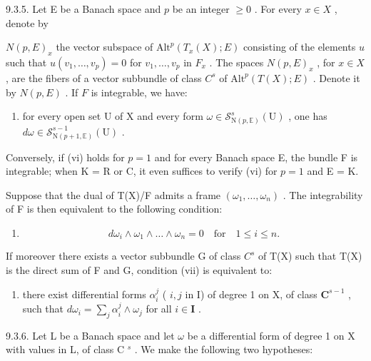 9.3.5. Let E be a Banach space and \(p\) be an integer \(\geqslant 0\) . For every \(x \in X\) , denote by

\(N(p, E)_{x}\) the vector subspace of \(\text{Alt}^{p}(T_{x}(X); E)\) consisting of the elements \(u\) such that \(u(v_{1}, \ldots, v_{p}) = 0\) for \(v_{1}, \ldots, v_{p}\) in \(F_{x}\) . The spaces \(N(p, E)_{x}\) , for \(x \in X\) , are the fibers of a vector subbundle of class \(C^{s}\) of \(\text{Alt}^{p}(T(X); E)\) . Denote it by \(N(p, E)\) . If \(F\) is integrable, we have:

\begin{enumerate}
\def\labelenumi{(\roman{enumi})}
\setcounter{enumi}{5}
\tightlist
\item
  for every open set U of X and every form \(\omega \in \mathcal{S}_{\mathrm{N}(p,\mathbb{E})}^s (\mathrm{U})\) , one has \(d\omega \in \mathcal{S}_{\mathrm{N}(p + 1,\mathbb{E})}^{s - 1}(\mathrm{U})\) .
\end{enumerate}

Conversely, if (vi) holds for \(p=1\) and for every Banach space E, the bundle F is integrable; when K = R or C, it even suffices to verify (vi) for \(p=1\) and E = K.

Suppose that the dual of T(X)/F admits a frame \((\omega_{1},\ldots,\omega_{n})\) . The integrability of F is then equivalent to the following condition:

\begin{enumerate}
\def\labelenumi{(\roman{enumi})}
\setcounter{enumi}{6}
\tightlist
\item
  \[
  d \omega_ {i} \wedge \omega_ {1} \wedge \dots \wedge \omega_ {n} = 0 \quad \text {for} \quad 1 \leqslant i \leqslant n.
  \]
\end{enumerate}

If moreover there exists a vector subbundle G of class \(C^{s}\) of T(X) such that T(X) is the direct sum of F and G, condition (vii) is equivalent to:

\begin{enumerate}
\def\labelenumi{(\roman{enumi})}
\setcounter{enumi}{7}
\tightlist
\item
  there exist differential forms \(\alpha_{i}^{j}\) ( \(i, j\) in I) of degree 1 on X, of class \(\mathbf{C}^{s-1}\) , such that \(d\omega_{i} = \sum_{j} \alpha_{i}^{j} \wedge \omega_{j}\) for all \(i \in \mathbf{I}\) .
\end{enumerate}

9.3.6. Let L be a Banach space and let \(\omega\) be a differential form of degree 1 on X with values in L, of class C \(^{s}\) . We make the following two hypotheses:

